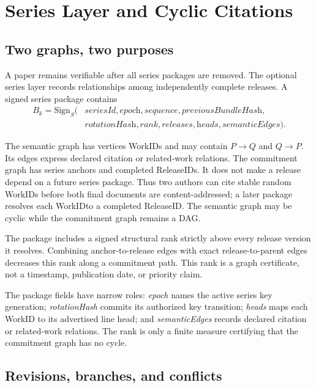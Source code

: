 \documentclass[11pt]{article}
\newcommand{\workid}{\textsf{WorkID}}
\newcommand{\releaseid}{\textsf{ReleaseID}}
\begin{document}
\section{Series Layer and Cyclic Citations}

\subsection{Two graphs, two purposes}

A paper remains verifiable after all series packages are removed. The optional series layer records relationships among independently complete releases. A signed series package contains
\[
\begin{aligned}
  B_k = \mathrm{Sign}_{S}(&\textit{seriesId},\textit{epoch},\textit{sequence},\textit{previousBundleHash},\\
                           &\textit{rotationHash},\textit{rank},\textit{releases},\textit{heads},\textit{semanticEdges}).
\end{aligned}
\]

The semantic graph has vertices \workid s and may contain $P \rightarrow Q$ and $Q \rightarrow P$. Its edges express declared citation or related-work relations. The commitment graph has series anchors and completed \releaseid s. It does not make a release depend on a future series package. Thus two authors can cite stable random \workid s before both final documents are content-addressed; a later package resolves each \workid to a completed \releaseid. The semantic graph may be cyclic while the commitment graph remains a DAG.

The package includes a signed structural rank strictly above every release version it resolves. Combining anchor-to-release edges with exact release-to-parent edges decreases this rank along a commitment path. This rank is a graph certificate, not a timestamp, publication date, or priority claim.

The package fields have narrow roles: \textit{epoch} names the active series
key generation; \textit{rotationHash} commits its authorized key transition;
\textit{heads} maps each WorkID to its advertised line head; and
\textit{semanticEdges} records declared citation or related-work relations.
The rank is only a finite measure certifying that the commitment graph has no
cycle.

\subsection{Revisions, branches, and conflicts}
\end{document}
